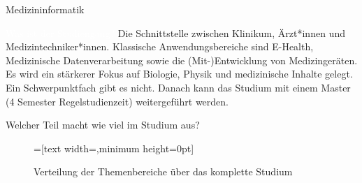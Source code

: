
\begin{Huge}
    Medizininformatik
\end{Huge}

\begin{exampleblock}{\textcolor{white}{Was ist der Studiengang?}}
    Die Schnittstelle zwischen Klinikum, \"Arzt*innen und Medizintechniker*innen. Klassische Anwendungsbereiche sind E-Health, Medizinische Datenverarbeitung sowie die (Mit-)Entwicklung von Medizinger\"aten. Es wird ein st\"arkerer Fokus auf Biologie, Physik und medizinische Inhalte gelegt. Ein Schwerpunktfach gibt es nicht. Danach kann das Studium mit einem Master \\ (4 Semester Regelstudienzeit) weitergef\"uhrt werden.
\end{exampleblock}

\begin{block}{Welcher Teil macht wie viel im Studium aus?}
    \begin{figure}[h!]
        \vspace{-20pt}
        \begin{minipage}{\linewidth}
            \centering
            =[text width={},minimum height=0pt]
        \end{minipage}
        \vspace{-20pt}
        \caption{Verteilung der Themenbereiche \"uber das komplette Studium}
    \end{figure}
\end{block}

